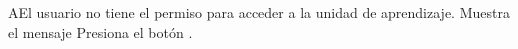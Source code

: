 \label{SP2-CU1-A}
\begin{UCtrayectoriaA}{A}{El usuario no tiene el permiso para acceder a la unidad de aprendizaje.}
    \UCpaso Muestra el mensaje 
    \UCpaso[\UCactor] Presiona el botón .
\end{UCtrayectoriaA} 

